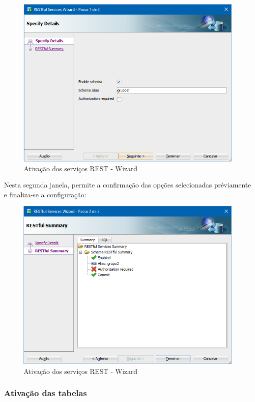 \documentclass[a4paper]{article}
\begin{document}
\begin{figure}[H]
\centering
\includegraphics[scale=0.6]{REST/rest_grupo2_2.png}
\caption{Ativação dos serviços REST - Wizard}
\end{figure}

Nesta segunda janela, permite a confirmação das opções selecionadas préviamente e finaliza-se a configuração:

\begin{figure}[H]
\centering
\includegraphics[scale=0.6]{REST/rest_grupo2_3.png}
\caption{Ativação dos serviços REST - Wizard}
\end{figure}

\subsubsection{Ativação das tabelas}
\hspace{3mm} 
\end{document}
